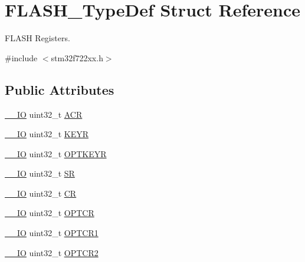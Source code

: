 \hypertarget{struct_f_l_a_s_h___type_def}{}\section{F\+L\+A\+S\+H\+\_\+\+Type\+Def Struct Reference}
\label{struct_f_l_a_s_h___type_def}


F\+L\+A\+SH Registers.  




{\ttfamily \#include $<$stm32f722xx.\+h$>$}

\subsection*{Public Attributes}
\begin{DoxyCompactItemize}
\item 
\mbox{\hyperlink{core__sc300_8h_aec43007d9998a0a0e01faede4133d6be}{\+\_\+\+\_\+\+IO}} uint32\+\_\+t \mbox{\hyperlink{struct_f_l_a_s_h___type_def_aaf432a8a8948613f4f66fcace5d2e5fe}{A\+CR}}
\item 
\mbox{\hyperlink{core__sc300_8h_aec43007d9998a0a0e01faede4133d6be}{\+\_\+\+\_\+\+IO}} uint32\+\_\+t \mbox{\hyperlink{struct_f_l_a_s_h___type_def_a802e9a26a89b44decd2d32d97f729dd3}{K\+E\+YR}}
\item 
\mbox{\hyperlink{core__sc300_8h_aec43007d9998a0a0e01faede4133d6be}{\+\_\+\+\_\+\+IO}} uint32\+\_\+t \mbox{\hyperlink{struct_f_l_a_s_h___type_def_a793cd13a4636c9785fdb99316f7fd7ab}{O\+P\+T\+K\+E\+YR}}
\item 
\mbox{\hyperlink{core__sc300_8h_aec43007d9998a0a0e01faede4133d6be}{\+\_\+\+\_\+\+IO}} uint32\+\_\+t \mbox{\hyperlink{struct_f_l_a_s_h___type_def_a52c4943c64904227a559bf6f14ce4de6}{SR}}
\item 
\mbox{\hyperlink{core__sc300_8h_aec43007d9998a0a0e01faede4133d6be}{\+\_\+\+\_\+\+IO}} uint32\+\_\+t \mbox{\hyperlink{struct_f_l_a_s_h___type_def_a7919306d0e032a855200420a57f884d7}{CR}}
\item 
\mbox{\hyperlink{core__sc300_8h_aec43007d9998a0a0e01faede4133d6be}{\+\_\+\+\_\+\+IO}} uint32\+\_\+t \mbox{\hyperlink{struct_f_l_a_s_h___type_def_a54026c3b5bc2059f1b187acb6c4817ac}{O\+P\+T\+CR}}
\item 
\mbox{\hyperlink{core__sc300_8h_aec43007d9998a0a0e01faede4133d6be}{\+\_\+\+\_\+\+IO}} uint32\+\_\+t \mbox{\hyperlink{struct_f_l_a_s_h___type_def_a180354afdf5ff27d04befd794c46156d}{O\+P\+T\+C\+R1}}
\item 
\mbox{\hyperlink{core__sc300_8h_aec43007d9998a0a0e01faede4133d6be}{\+\_\+\+\_\+\+IO}} uint32\+\_\+t \mbox{\hyperlink{struct_f_l_a_s_h___type_def_a175f69fa4b1d4d71c2cf5852e94a953e}{O\+P\+T\+C\+R2}}
\end{DoxyCompactItemize}


